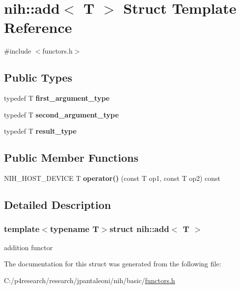\hypertarget{structnih_1_1add}{
\section{nih\-:\-:add$<$ \-T $>$ \-Struct \-Template \-Reference}
\label{structnih_1_1add}
}


{\ttfamily \#include $<$functors.\-h$>$}

\subsection*{\-Public \-Types}
\begin{DoxyCompactItemize}
\item 
\hypertarget{structnih_1_1add_aca0dbac8ae4ad35f63f15ac3ef772c7d}{
typedef \-T {\bfseries first\-\_\-argument\-\_\-type}}
\label{structnih_1_1add_aca0dbac8ae4ad35f63f15ac3ef772c7d}

\item 
\hypertarget{structnih_1_1add_a274be3a541a83d9484fea01247cef27f}{
typedef \-T {\bfseries second\-\_\-argument\-\_\-type}}
\label{structnih_1_1add_a274be3a541a83d9484fea01247cef27f}

\item 
\hypertarget{structnih_1_1add_a2ba19d328dd81e5767f39923fad31097}{
typedef \-T {\bfseries result\-\_\-type}}
\label{structnih_1_1add_a2ba19d328dd81e5767f39923fad31097}

\end{DoxyCompactItemize}
\subsection*{\-Public \-Member \-Functions}
\begin{DoxyCompactItemize}
\item 
\hypertarget{structnih_1_1add_a7a70f756c3f368ab0d0fc89b9fd85da6}{
\-N\-I\-H\-\_\-\-H\-O\-S\-T\-\_\-\-D\-E\-V\-I\-C\-E \-T {\bfseries operator()} (const \-T op1, const \-T op2) const }
\label{structnih_1_1add_a7a70f756c3f368ab0d0fc89b9fd85da6}

\end{DoxyCompactItemize}


\subsection{\-Detailed \-Description}
\subsubsection*{template$<$typename T$>$struct nih\-::add$<$ T $>$}

addition functor 

\-The documentation for this struct was generated from the following file\-:\begin{DoxyCompactItemize}
\item 
\-C\-:/p4research/research/jpantaleoni/nih/basic/\hyperlink{functors_8h}{functors.\-h}\end{DoxyCompactItemize}

